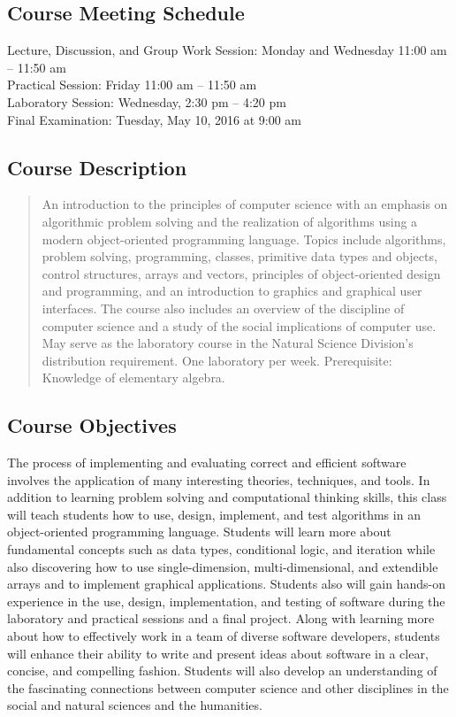 \subsection*{Course Meeting Schedule}

Lecture, Discussion, and Group Work Session: Monday and Wednesday 11:00 am -- 11:50 am \\
Practical Session: Friday 11:00 am -- 11:50 am \\
Laboratory Session: Wednesday, 2:30 pm -- 4:20 pm \\
Final Examination: Tuesday, May 10, 2016 at 9:00 am

\subsection*{Course Description}

\begin{quote}

An introduction to the principles of computer science with an emphasis on algorithmic problem solving and the
realization of algorithms using a modern object-oriented programming language. Topics include algorithms, problem
solving, programming, classes, primitive data types and objects, control structures, arrays and vectors, principles of
object-oriented design and programming, and an introduction to graphics and graphical user interfaces. The course also
includes an overview of the discipline of computer science and a study of the social implications of computer use. May
serve as the laboratory course in the Natural Science Division's distribution requirement. One laboratory per week.
Prerequisite: Knowledge of elementary algebra.

\end{quote}

\subsection*{Course Objectives}

The process of implementing and evaluating correct and efficient software involves the application of many interesting
theories, techniques, and tools.  In addition to learning problem solving and computational thinking skills, this class
will teach students how to use, design, implement, and test algorithms in an object-oriented programming language.
Students will learn more about fundamental concepts such as data types, conditional logic, and iteration while also
discovering how to use single-dimension, multi-dimensional, and extendible arrays and to implement graphical
applications.  Students also will gain hands-on experience in the use, design, implementation, and testing of software
during the laboratory and practical sessions and a final project.  Along with learning more about how to effectively
work in a team of diverse software developers, students will enhance their ability to write and present ideas about software in
a clear, concise, and compelling fashion.  Students will also develop an understanding of the fascinating connections
between computer science and other disciplines in the social and natural sciences and the humanities.

